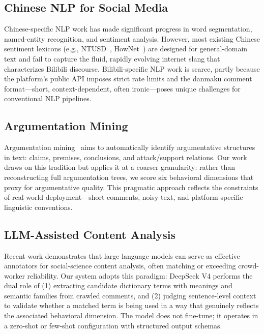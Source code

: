 \documentclass[11pt,a4paper]{article}
\begin{document}
\subsection{Chinese NLP for Social Media}

Chinese-specific NLP work has made significant
progress in word segmentation, named-entity recognition, and sentiment analysis.
However, most existing Chinese sentiment lexicons (e.g., NTUSD~\cite{ku2007mining},
HowNet~\cite{dong2006hownet}) are designed for general-domain text and fail to capture
the fluid, rapidly evolving internet slang that characterizes Bilibili discourse.
Bilibili-specific NLP work is scarce, partly because the platform's public API imposes
strict rate limits and the danmaku comment format---short, context-dependent, often
ironic---poses unique challenges for conventional NLP pipelines.

\subsection{Argumentation Mining}

Argumentation mining~\cite{stede2018argumentation,peldszus2013argument} aims to
automatically identify argumentative structures in text: claims, premises, conclusions,
and attack/support relations. Our work draws on this tradition but applies it at a
coarser granularity: rather than reconstructing full argumentation trees, we score
six behavioral dimensions that proxy for argumentative quality. This pragmatic approach
reflects the constraints of real-world deployment---short comments, noisy text, and
platform-specific linguistic conventions.

\subsection{LLM-Assisted Content Analysis}

Recent work demonstrates that large language models can serve as effective
annotators for social-science content analysis, often matching or exceeding
crowd-worker reliability. Our system adopts this paradigm:
DeepSeek V4 performs the dual role of (1) extracting candidate dictionary terms with
meanings and semantic families from crawled comments, and (2) judging sentence-level
context to validate whether a matched term is being used in a way that genuinely
reflects the associated behavioral dimension. The model does not fine-tune; it operates
in a zero-shot or few-shot configuration with structured output schemas.
\end{document}
